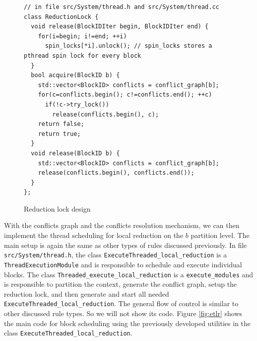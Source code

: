 \documentclass{article}
\begin{document}
\begin{figure}[h]
\begin{lstlisting}[escapechar=@]
// in file src/System/thread.h and src/System/thread.cc
class ReductionLock {
  void release(BlockIDIter begin, BlockIDIter end) {
    for(i=begin; i!=end; ++i)
      spin_locks[*i].unlock(); // spin_locks stores a pthread spin lock for every block
  }
  bool acquire(BlockID b) {
    std::vector<BlockID> conflicts = conflict_graph[b];
    for(c=conflicts.begin(); c!=conflicts.end(); ++c)
      if(!c->try_lock())
        release(conflicts.begin(), c);
	return false;
    return true;
  }
  void release(BlockID b) {
    std::vector<BlockID> conflicts = conflict_graph[b];
    release(conflicts.begin(), conflicts.end());
  }
};
\end{lstlisting}
\caption{Reduction lock design\label{fig:rl}}
\end{figure}

With the conflicts graph and the conflicts resolution mechanism, we can
then implement the thread scheduling for local reduction on the $b$
partition level.  The main setup is again the same as other types of
rules discussed previously.  In file \texttt{src/System/thread.h}, the
class \lstinline{ExecuteThreaded_local_reduction} is a
\lstinline{ThreadExecutionModule} and is responsible to schedule and
execute individual blocks.  The class
\lstinline{Threaded_execute_local_reduction} is a
\lstinline{execute_modules} and is responsible to partition the context,
generate the conflict graph, setup the reduction lock, and then generate
and start all needed \lstinline{ExecuteThreaded_local_reduction}.  The
general flow of control is similar to other discussed rule types.  So we
will not show its code.  Figure \ref{fig:etlr} shows the main code for
block scheduling using the previously developed utilities in the class
\lstinline{ExecuteThreaded_local_reduction}.
\end{document}
